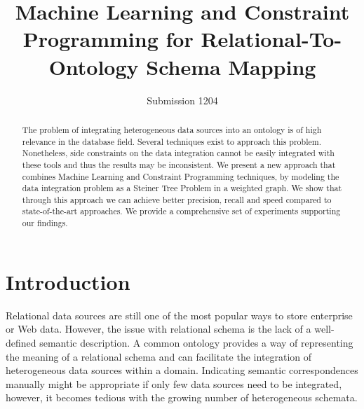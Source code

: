 \documentclass[letterpaper]{article} %
\newcommand{\ignore}[1]{}
\begin{document}
%
\title{Machine Learning and Constraint Programming for Relational-To-Ontology Schema Mapping }
\author{Submission 1204}
\maketitle
\begin{abstract}
The problem of integrating heterogeneous data sources into an ontology is of high 
relevance in the database field. Several techniques exist to approach this 
problem. Nonetheless, side constraints on the data integration cannot be easily 
integrated with these tools and thus the results may be inconsistent. We 
present a new approach that combines Machine Learning and 
Constraint Programming techniques, by modeling the data integration problem as 
a Steiner Tree Problem in a weighted graph. We show that through this approach 
we can achieve better precision, recall and speed compared to state-of-the-art 
approaches. We provide a comprehensive set of experiments supporting our 
findings.
\end{abstract}

\section{Introduction}
\ignore{
The problem of integrating heterogeneous data sources is a long standing issue 
in the database research field and is of high relevance in many real-world 
domains (see e.g. 
\cite{Rahm:2001:SAA:767149.767154,Dhamankar:imap,Taheriyan2013}).
A common approach to tackle this problem is to design a global model and to
construct source descriptions which specify mappings between the sources and
the global model \cite{doan2012principles}.

In our case, we would like this global model to account not only for structural properties of the original data sources, but also to include the semantics, which is usually implicitly present in the sources.
In other words, we want to build a semantic model which describes the data sources in terms of concepts and relationships defined by an ontology \cite{taheriyan2016learning}.
Henceforth, we focus on a specific data integration problem: automatically mapping a new relational data source onto a user provided ontology.
}
Relational data sources are still one of the most popular ways to store enterprise or Web data. However, the issue with relational schema is the lack of a well-defined semantic description.
A common ontology provides a way of representing the meaning of a relational schema and can facilitate the integration of heterogeneous data sources within a domain.
Indicating semantic correspondences manually might be appropriate if only few data sources need to be integrated, however, it becomes tedious with the growing number of heterogeneous schemata.
\end{document}
